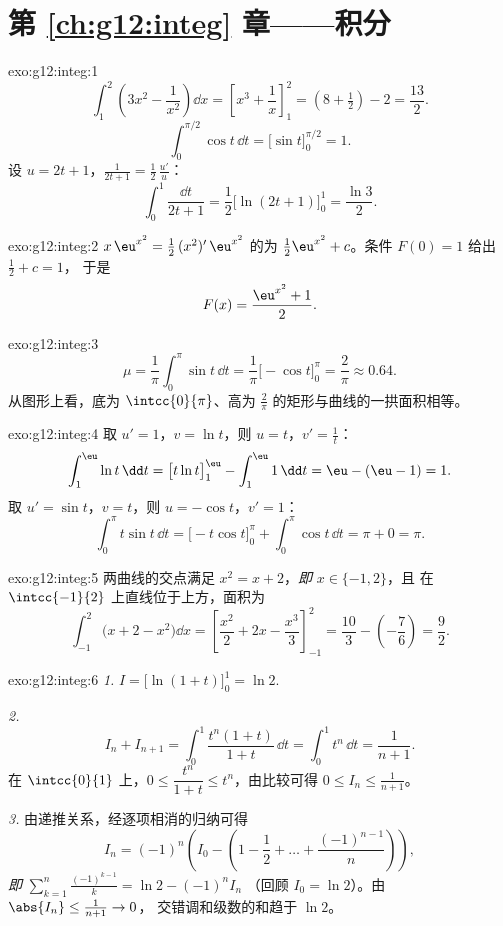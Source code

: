 \section*{第 \ref{ch:g12:integ} 章——积分}

\begin{solution}{exo:g12:integ:1}
\[
\int_1^2 \left(3x^2 - \frac{1}{x^2}\right)\dd x
= \left[x^3 + \frac1x\right]_1^2 = \left(8 + \tfrac12\right) - 2 = \frac{13}{2}.
\]
\[
\int_0^{\pi/2} \cos t\,\dd t = \bigl[\sin t\bigr]_0^{\pi/2} = 1 .
\]
设 $u = 2t+1$，$\frac{1}{2t+1} = \frac12\,\frac{u'}{u}$：
\[
\int_0^1 \frac{\dd t}{2t+1} = \frac12\bigl[\ln(2t+1)\bigr]_0^1
= \frac{\ln 3}{2}.
\]
\end{solution}

\begin{solution}{exo:g12:integ:2}
$x\,\eu^{x^2} = \frac12\,(x^2)'\,\eu^{x^2}$ 的为
$\frac12\eu^{x^2} + c$。条件 $F(0) = 1$ 给出 $\frac12 + c = 1$，
于是
\[
F(x) = \frac{\eu^{x^2} + 1}{2}.
\]
\end{solution}

\begin{solution}{exo:g12:integ:3}
\[
\mu = \frac{1}{\pi}\int_0^\pi \sin t\,\dd t
= \frac{1}{\pi}\bigl[-\cos t\bigr]_0^\pi = \frac{2}{\pi} \approx 0.64 .
\]
从图形上看，底为 $\intcc{0}{\pi}$、高为
$\frac{2}{\pi}$ 的矩形与曲线的一拱面积相等。
\end{solution}

\begin{solution}{exo:g12:integ:4}
取 $u' = 1$，$v = \ln t$，则 $u = t$，$v' = \frac1t$：
\[
\int_1^{\eu} \ln t\,\dd t = \bigl[t\ln t\bigr]_1^{\eu} - \int_1^{\eu} 1\,\dd t
= \eu - (\eu - 1) = 1 .
\]
取 $u' = \sin t$，$v = t$，则 $u = -\cos t$，$v' = 1$：
\[
\int_0^\pi t\sin t\,\dd t = \bigl[-t\cos t\bigr]_0^\pi + \int_0^\pi \cos t\,\dd t
= \pi + 0 = \pi .
\]
\end{solution}

\begin{solution}{exo:g12:integ:5}
两曲线的交点满足 $x^2 = x + 2$，\emph{即} $x \in \{-1, 2\}$，且
在 $\intcc{-1}{2}$ 上直线位于上方，面积为
\[
\int_{-1}^{2} \bigl(x + 2 - x^2\bigr)\dd x
= \left[\frac{x^2}{2} + 2x - \frac{x^3}{3}\right]_{-1}^{2}
= \frac{10}{3} - \left(-\frac{7}{6}\right) = \frac{9}{2}.
\]
\end{solution}

\begin{solution}{exo:g12:integ:6}
\emph{1.} $I = \bigl[\ln(1+t)\bigr]_0^1 = \ln 2$.

\emph{2.}
\[
I_n + I_{n+1} = \int_0^1 \frac{t^n(1 + t)}{1+t}\,\dd t
= \int_0^1 t^n \,\dd t = \frac{1}{n+1}.
\]
在 $\intcc{0}{1}$ 上，$0 \leq \dfrac{t^n}{1+t} \leq t^n$，由比较可得
$0 \leq I_n \leq \frac{1}{n+1}$。

\emph{3.} 由递推关系，经逐项相消的归纳可得
\[
I_n = (-1)^n\left(I_0 - \left(1 - \frac12 + \dots + \frac{(-1)^{n-1}}{n}\right)\right),
\]
\emph{即}
$\displaystyle\sum_{k=1}^{n} \frac{(-1)^{k-1}}{k} = \ln 2 - (-1)^n I_n$
（回顾 $I_0 = \ln 2$）。由 $\abs{I_n} \leq \frac{1}{n+1} \to 0$，
交错调和级数的和趋于 $\ln 2$。
\end{solution}

